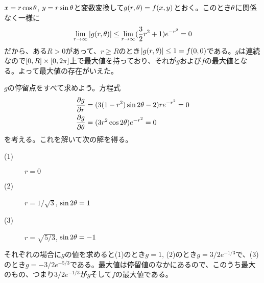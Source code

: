 \newpage

\subsubsection{}%
\begin{sol}
  $x = r \cos {\theta}$, $y = r \sin {\theta}$と変数変換して$g(r, {\theta} ) = f(x,y)$とおく。このとき${\theta}$に関係なく一様に
  \[
  \lim_{r \to \infty} \left \lvert g(r,{\theta}) \right \rvert \leq \lim_{r \to \infty} (\frac{3}{2}r^2 + 1)e^{-r^2} = 0
  \]
  だから、ある$R > 0$があって、$r \geq R$のとき$ \left \lvert g(r,{\theta}) \right \rvert \leq 1 = f(0,0)$である。$g$は連続なので$[0,R] \times [0,2\pi]$上で最大値を持っており、それが$g$および$f$の最大値となる。よって最大値の存在がいえた。

  $g$の停留点をすべて求めよう。方程式
\begin{align*}
\frac{\partial g}{\partial r} &= (3(1-r^2) \sin 2{\theta} - 2)re^{-r^2} = 0 \\
\frac{\partial g}{\partial {\theta}} &= (3r^2 \cos 2{\theta}) e^{-r^2} = 0
\end{align*}
を考える。これを解いて次の解を得る。
\begin{description}
  \item[(1)] $r=0$
  \item[(2)] $r= 1/ \sqrt{3}$, $\sin 2 {\theta} = 1$
  \item[(3)] $r = \sqrt{5/3}$, $\sin 2 {\theta} = -1$
\end{description}
それぞれの場合に$g$の値を求めると(1)のとき$g=1$, (2)のとき$g= 3/2 e^{- 1/3}$で、(3)のとき$g= - 3/2 e^{- 5/3}$である。最大値は停留値のなかにあるので、このうち最大のもの、つまり$3/2 e^{- 1/3}$が$g$そして$f$の最大値である。
\end{sol}

\newpage

